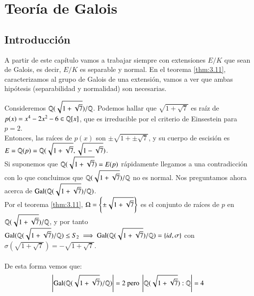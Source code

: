 
\chapter{Teoría de Galois}

\section{Introducción}

A partir de este capítulo vamos a trabajar siempre con extensiones $E/K$ que sean de Galois, es decir, $E/K$ es separable y normal. En el teorema \ref{thm:3.11}, caracterizamos al grupo de Galois de una extensión, vamos a ver que ambas hipótesis (separabilidad y normalidad) son necesarias.

\begin{eg}
    Consideremos $\mathbb{Q}(\sqrt{1 + \sqrt 7})/\mathbb{Q}$. Podemos hallar que $\sqrt{1 + \sqrt 7}$ es raíz de $p(x) = x^4-2x^2-6 \in \mathbb{Q}[x]$, que es irreducible por el criterio de Einsestein para $p=2$.\\
    Entonces, las raíces de $p(x)$ son $\pm\sqrt{1 + \pm\sqrt 7}$, y su cuerpo de escisión es $E = \mathbb{Q}(p) = \mathbb{Q}(\sqrt{1 + \sqrt 7}, \sqrt{1 - \sqrt 7})$.\\
    Si suponemos que $\mathbb{Q}(\sqrt{1 + \sqrt 7}) = E(p)$ rápidamente llegamos a una contradicción con lo que concluimos que $\mathbb{Q}(\sqrt{1 + \sqrt 7})/\mathbb{Q}$ no es normal. Nos  preguntamos ahora acerca de $\mathrm{Gal}(\mathbb{Q}(\sqrt{1 + \sqrt 7})/\mathbb{Q})$.\\
    Por el teorema \ref{thm:3.11}, $\Omega = \left\{\pm \sqrt{1 + \sqrt 7}\right\}$ es el conjunto de raíces de $p$ en $\mathbb{Q}(\sqrt{1 + \sqrt 7})/\mathbb{Q}$, y por tanto $\mathrm{Gal}(\mathbb{Q}(\sqrt{1 + \sqrt 7})/\mathbb{Q}) \leq S_2 \implies \mathrm{Gal}(\mathbb{Q}(\sqrt{1 + \sqrt 7})/\mathbb{Q}) = \left\{id, \sigma\right\}$ con $\sigma(\sqrt{1 + \sqrt 7}) = -\sqrt{1 + \sqrt 7}$.\\\\
    De esta forma vemos que:
    $$
        \left|\mathrm{Gal}(\mathbb{Q}(\sqrt{1 + \sqrt 7})/\mathbb{Q})\right| = 2 \text{ pero } \left|\mathbb{Q}(\sqrt{1 + \sqrt 7}):\mathbb{Q}\right| = 4
    $$
\end{eg}

